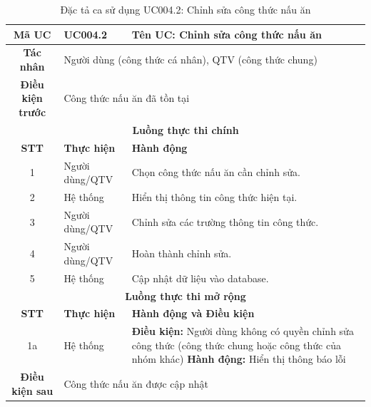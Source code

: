 \begin{table}[H]
    \centering
    \label{tab:uc004-2}
    \begin{tabularx}{\textwidth}{|c|p{3.5cm}|X|}
        \hline
        \rowcolor{headergreen} 
        \textbf{Mã UC} & \textbf{UC004.2} & \textbf{Tên UC: Chỉnh sửa công thức nấu ăn} \\ \hline
        \textbf{Tác nhân} & \multicolumn{2}{X|}{Người dùng (công thức cá nhân), QTV (công thức chung)} \\ \hline
        \textbf{Điều kiện trước} & \multicolumn{2}{X|}{Công thức nấu ăn đã tồn tại} \\ \hline
        
        \multicolumn{3}{|c|}{\cellcolor{headerorange}\textbf{Luồng thực thi chính}} \\ \hline
        \rowcolor{graybg} \textbf{STT} & \textbf{Thực hiện} & \textbf{Hành động} \\ \hline
        1 & Người dùng/QTV & Chọn công thức nấu ăn cần chỉnh sửa. \\ \hline
        2 & Hệ thống & Hiển thị thông tin công thức hiện tại. \\ \hline
        3 & Người dùng/QTV & Chỉnh sửa các trường thông tin công thức. \\ \hline
        4 & Người dùng/QTV & Hoàn thành chỉnh sửa. \\ \hline
        5 & Hệ thống & Cập nhật dữ liệu vào database. \\ \hline
        
        \multicolumn{3}{|c|}{\cellcolor{headerorange}\textbf{Luồng thực thi mở rộng}} \\ \hline
        \rowcolor{graybg} \textbf{STT} & \textbf{Thực hiện} & \textbf{Hành động và Điều kiện} \\ \hline
        1a & Hệ thống & \textbf{Điều kiện:} Người dùng không có quyền chỉnh sửa công thức (công thức chung hoặc công thức của nhóm khác) \newline \textbf{Hành động:} Hiển thị thông báo lỗi \\ \hline
        
        \textbf{Điều kiện sau} & \multicolumn{2}{X|}{Công thức nấu ăn được cập nhật} \\ \hline
    \end{tabularx}
    \caption{Đặc tả ca sử dụng UC004.2: Chỉnh sửa công thức nấu ăn}
\end{table}

